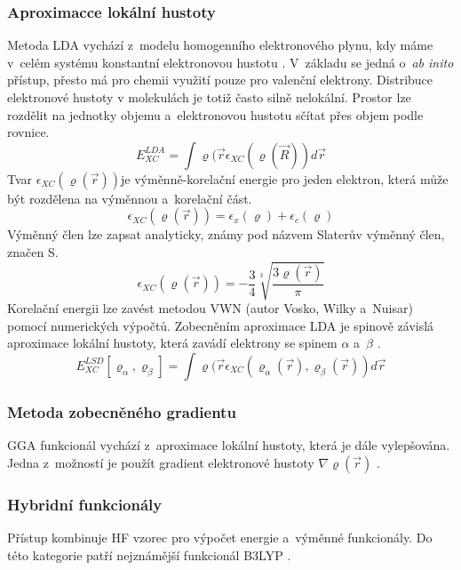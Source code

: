 \documentclass[
  printed, %
  table,   %
  lof,     %
  lot,     %
  oneside,
]{fithesis3}
\begin{document}
\subsubsection{Aproximacce lokální hustoty}
Metoda LDA vychází z~modelu homogenního elektronového plynu, kdy máme v~celém systému konstantní elektronovou hustotu \cite{dftshrnutivysledky}. V~základu se jedná o~\textit{ab inito} přístup, přesto má pro chemii využití pouze pro valenční elektrony. Distribuce elektronové hustoty v molekulách je totiž často silně nelokální. Prostor lze rozdělit na jednotky objemu a~elektronovou hustotu sčítat přes objem podle rovnice.
\begin{equation}
E_{XC}^{LDA} = \int \varrho (\vec{r} \epsilon_{XC} (\varrho (\vec{R})) d \vec{r}
\label{LDA_vyraz_pro_obecnou_energii}
\end{equation}
Tvar $\epsilon_{XC}(\varrho (\vec{r}))$je výměnně-korelační energie pro jeden elektron, která může být rozdělena na výměnnou a~korelační část. 
\begin{equation}
\epsilon_{XC}(\varrho (\vec{r})) = \epsilon_x (\varrho) + \epsilon_c (\varrho)
\label{LDA_tvar_vymene_korelacni_energie}
\end{equation}
Výměnný člen lze zapsat analyticky, známy pod názvem Slaterův výměnný člen, značen S.
\begin{equation}
\epsilon_{XC}(\varrho (\vec{r})) = - \frac{3}{4} \sqrt[3]{\frac{3 \varrho (\vec{r})}{\pi}}
\label{LDA_vymenny_clen}
\end{equation}
Korelační energii lze zavést metodou VWN (autor Vosko, Wilky a~Nuisar) pomocí numerických výpočtů. Zobecněním aproximace LDA je spinově závislá aproximace lokální hustoty, která zavádí elektrony se spinem $\alpha$ a~$\beta$ \cite{koch2000chemist}.
\begin{equation}
E_{XC}^{LSD}[\varrho_{\alpha}, \varrho_{\beta}] = \int \varrho (\vec{r} \epsilon_{XC}( \varrho_{\alpha}(\vec{r}), \varrho_{\beta}(\vec{r})) d \vec{r}
\end{equation}

\subsubsection{Metoda zobecněného gradientu}
GGA funkcionál vychází z~aproximace lokální hustoty, která je dále vylepšována. Jedna z~možností je použít gradient elektronové hustoty $\nabla \varrho (\vec{r})$ \cite{koch2000chemist}.

\subsubsection{Hybridní funkcionály}
Přístup kombinuje HF vzorec pro výpočet energie a~výměnné funkcionály. Do této kategorie patří nejznámější funkcionál B3LYP \cite{dftshrnutivysledky}.
\end{document}
